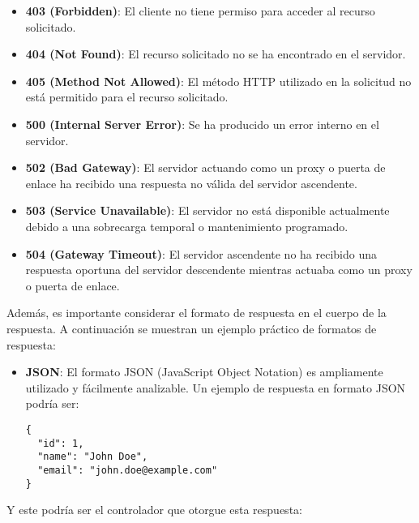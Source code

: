 \documentclass[executivepaper]{article}
\begin{document}
\begin{itemize}
    \item \textbf{403 (Forbidden)}: El cliente no tiene permiso para acceder al recurso solicitado.
    
    \item \textbf{404 (Not Found)}: El recurso solicitado no se ha encontrado en el servidor.
    
    \item \textbf{405 (Method Not Allowed)}: El método HTTP utilizado en la solicitud no está permitido para el recurso solicitado.
    
    \item \textbf{500 (Internal Server Error)}: Se ha producido un error interno en el servidor.
    
    \item \textbf{502 (Bad Gateway)}: El servidor actuando como un proxy o puerta de enlace ha recibido una respuesta no válida del servidor ascendente.
    
    \item \textbf{503 (Service Unavailable)}: El servidor no está disponible actualmente debido a una sobrecarga temporal o mantenimiento programado.
    
    \item \textbf{504 (Gateway Timeout)}: El servidor ascendente no ha recibido una respuesta oportuna del servidor descendente mientras actuaba como un proxy o puerta de enlace.
    
    \end{itemize}

Además, es importante considerar el formato de respuesta en el cuerpo de la respuesta. A continuación se muestran un ejemplo práctico de formatos de respuesta:

\begin{itemize}
  \item \textbf{JSON}: El formato JSON (JavaScript Object Notation) es ampliamente utilizado y fácilmente analizable. Un ejemplo de respuesta en formato JSON podría ser:

  \begin{lstlisting}[language={[Sharp]C}]
{
  "id": 1,
  "name": "John Doe",
  "email": "john.doe@example.com"
}
\end{lstlisting}
\end{itemize}

Y este podría ser el controlador que otorgue esta respuesta:
\end{document}
